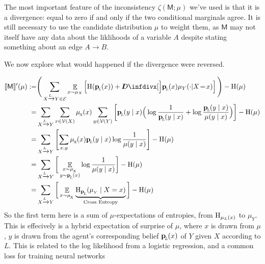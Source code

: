 \documentclass{article}
\newcommand{\bp}[1][L]{\mat{p}_{\!_#1\!}}
\newcommand{\V}{\mathcal V}
\newcommand{\Ed}{\mathcal E}
\newcommand{\sfM}{\mathsf M}
\begin{document}
	The most important feature of the inconsistency $\zeta(\sfM ; \mu)$ we've used is that it is a divergence: equal to zero if and only if the two conditional marginals agree. It is still necessary to use the candidate distribution $\mu$ to weight them, as $\sfM$ may not itself have any data about the liklihoods of a variable $A$ despite stating something about an edge $A \to B$.
		
	We now explore what would happened if the divergence were reversed.

	\begin{align*}
		 \bbr{\sfM}'(\mu) :=& \Bigg(\sum_{ X \xrightarrow{\!\!L} Y  \in \Ed } \E_{x \sim \mu_X}  \left[ \H (\bp (x)) +\kldiv[\Big]{\bp(x) }{ \mu_Y(\cdot | X \!=\! x) }  \right] \Bigg) - \H(\mu) \\
		 =& \sum_{ X \xrightarrow{\!\!L} Y } \sum_{x \in \V(X)} \mu_{\!_X}\!(x) \sum_{y \in \V(Y)}  \left[ \bp (y\mid x) \Big(\log \frac{1}{\bp(y \mid x)} + \log \frac{\bp(y \mid x)}{\mu(y \mid x)}\Big)  \right]  - \H(\mu) \\
		 =& \sum_{ X \xrightarrow{\!\!L} Y} \left[ \sum_{x, y }   \mu_{\!_X}\!(x) \bp (y\mid x) \log \frac{1}{\mu(y \mid x)}  \right]  - \H(\mu) \\
		 =& \sum_{ X \xrightarrow{\!\!L} Y} \bigg[ \E_{\substack{x \sim \mu_{\!_X} \\[-0.0em] y \sim \bp(x)}} \log \frac{1}{\mu(y \mid x)}  \bigg]  - \H(\mu) \\
		 =& \sum_{ X \xrightarrow{\!\!L} Y} \bigg[ \E_{x \sim \mu_{\!_X}} \underbrace{ \H_{\bp} (\mu_{_Y} \mid X = x)}_{\text{Cross Entropy}}  \bigg]  - \H(\mu ) \\
	\end{align*}
	So the first term here is a sum of $\mu$-expectations of entropies, from $\mathrm{H}_{\mu_L(x)}$ to $\mu_Y$. 
	This is effecively is a hybrid expectation of surprise of $\mu$, where $x$ is drawn from $\mu$, $y$ is drawn from the agent's corresponding belief $\bp(x)$ of $Y$ given $X$ according to $L$. This is related to the log likelihood from a logistic regression, and a common loss for training neural networks
	
	
	
	
	
\end{document}
